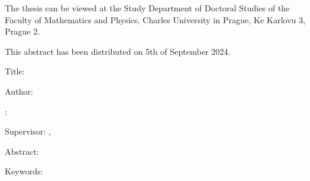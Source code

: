 {The thesis can be viewed at the Study Department of Doctoral Studies of the
Faculty of Mathematics and Physics, Charles University in Prague, Ke Karlovu 3,
Prague 2.

This abstract has been distributed on 5th of September 2024.
}

\newpage


{
\small
\setlength\parindent{0mm}
\setlength\parskip{2ex}

Title:
\ThesisTitle

Author:
\ThesisAuthor

\DeptType:
\Department

Supervisor:
\Supervisor, \SupervisorsDepartment

Abstract:
\Abstract

Keywords:
\Keywords
}

\newpage

